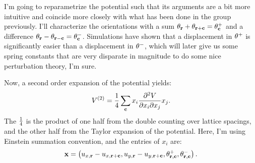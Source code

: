 \documentclass[12pt]{article}
\begin{document}
I'm going to reparametrize the potential such that its arguments are a bit more intuitive and coincide more closely with what has been done in the group previously. I'll characterize the orientations with a sum $\theta_{\mathbf{r}} + \theta_{\mathbf{r} + \mathbf{c}} = \theta^+_{\mathbf{c}}$ and a difference $\theta_{\mathbf{r}} - \theta_{\mathbf{r} - \mathbf{c}} = \theta^-_{\mathbf{c}}$. Simulations have shown that a displacement in $\theta^+$ is significantly easier than a displacement in $\theta^-$, which will later give us some spring constants that are very disparate in magnitude to do some nice perturbation theory, I'm sure.

Now, a second order expansion of the potential yields:
\[ V^{(2)} = \frac{1}{4}\sum_{\mathbf{c}} x_i \frac{\partial^2 V}{\partial x_i \partial x_j}x_j.\]
The $\frac{1}{4}$ is the product of one half from the double counting over lattice spacings, and the other half from the Taylor expansion of the potential. Here, I'm using Einstein summation convention, and the entries of $x_i$ are:
\[ \mathbf{x} = \left(u_{x,\mathbf{r}}-u_{x,\mathbf{r} + \mathbf{c}},u_{y,\mathbf{r}} - u_{y,\mathbf{r} + \mathbf{c}},\theta^+_{\mathbf{r}, \mathbf{c}},\theta^-_{\mathbf{r},\mathbf{c}}\right).\]
\end{document}
